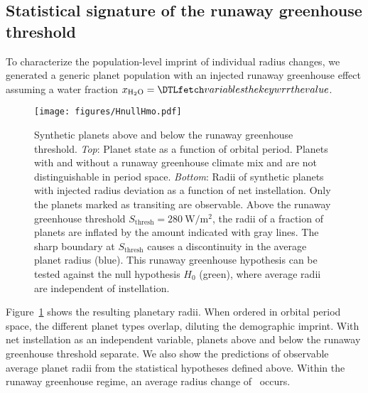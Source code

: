 \documentclass[modern]{aastex631}
\begin{document}
\subsection{Statistical signature of the runaway greenhouse threshold}
To characterize the population-level imprint of individual radius changes, we generated a generic planet population with an injected runaway greenhouse effect assuming a water fraction $x_\mathrm{H_2O} = \var{wrr}$.
\begin{figure}
    \begin{centering}
        \texttt{[image: figures/HnullHmo.pdf]}
        \caption{Synthetic planets above and below the runaway greenhouse threshold.
        \textit{Top}: Planet state as a function of orbital period. Planets with and without a runaway greenhouse climate mix and are not distinguishable in period space.
        \textit{Bottom}: Radii of synthetic planets with injected radius deviation as a function of net instellation. Only the planets marked as transiting are observable. Above the runaway greenhouse threshold $S_\mathrm{thresh} =\SI{280}{\watt\per\meter\squared} $, the radii of a fraction of planets are inflated by the amount indicated with gray lines. The sharp boundary at $S_\mathrm{thresh}$ causes a discontinuity in the average planet radius (blue). This runaway greenhouse hypothesis can be tested against the null hypothesis $H_0$ (green), where average radii are independent of instellation.}
        \label{fig:HnullHmo}
    \end{centering}
\end{figure}
Figure~\ref{fig:HnullHmo} shows the resulting planetary radii.
When ordered in orbital period space, the different planet types overlap, diluting the demographic imprint.
With net instellation as an independent variable, planets above and below the runaway greenhouse threshold separate.
We also show the predictions of observable average planet radii from the statistical hypotheses defined above.
Within the runaway greenhouse regime, an average radius change of \avgRadiusChange\ occurs.
\end{document}
